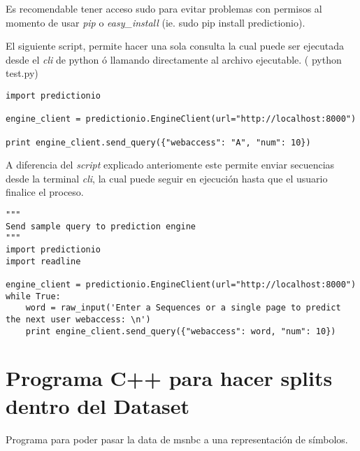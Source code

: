 Es recomendable tener acceso sudo para evitar problemas con permisos al momento de usar \emph{pip} o \emph{easy\_install} {(ie. sudo pip install predictionio)}.




El siguiente script, permite hacer una sola consulta la cual puede ser ejecutada desde el \emph{cli} de python ó llamando directamente al archivo ejecutable. ( {python test.py})

\begin{lstlisting}[frame=single,basicstyle=\ttfamily\tiny,]
import predictionio

engine_client = predictionio.EngineClient(url="http://localhost:8000")

print engine_client.send_query({"webaccess": "A", "num": 10})
\end{lstlisting}



\newpage
A diferencia del \emph{script} explicado anteriomente este permite enviar secuencias desde la terminal \emph{cli}, la cual puede seguir en ejecución hasta que el usuario finalice el proceso.







\begin{lstlisting}[frame=single,basicstyle=\ttfamily\tiny,]
"""
Send sample query to prediction engine
"""
import predictionio
import readline

engine_client = predictionio.EngineClient(url="http://localhost:8000")
while True:
    word = raw_input('Enter a Sequences or a single page to predict the next user webaccess: \n')
    print engine_client.send_query({"webaccess": word, "num": 10})
\end{lstlisting}





\section{Programa C++ para hacer splits dentro del Dataset}
Programa para poder pasar la data de msnbc a una representación de símbolos.



